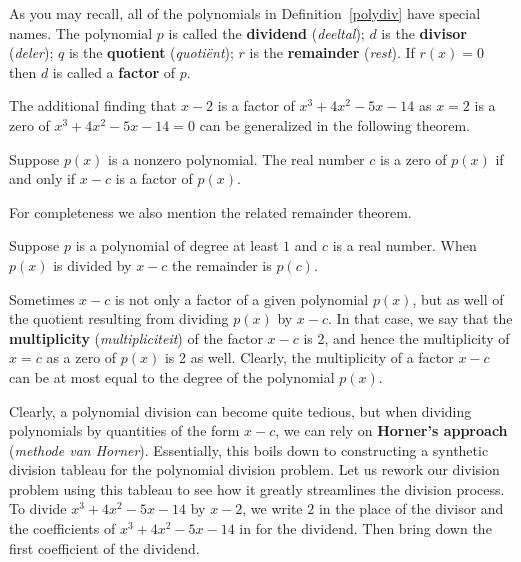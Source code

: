As you may recall, all of the polynomials in Definition~\ref{polydiv} have special names.  The polynomial $p$ is called the  \textbf{dividend} (\textit{deeltal}); $d$ is the  \textbf{divisor} (\textit{deler}); $q$ is the  \textbf{quotient} (\textit{quoti\"ent}); $r$ is the  \textbf{remainder} (\textit{rest}).  If $r(x)=0$ then $d$ is called a  \textbf{factor} of $p$.  


The additional finding that $x-2$ is a factor of $x^3 + 4x^2-5x-14$ as $x=2$ is a zero of $x^3 + 4x^2-5x-14=0$ can be generalized in the following theorem. 

\begin{theorem} \label{factorthm}
  Suppose  $p(x)$ is a nonzero polynomial.  The real number $c$ is a zero of  $p(x)$ if and only if $x-c$ is a factor of $p(x)$.  
\end{theorem}

For completeness we also mention the related remainder theorem.
\begin{theorem}
\label{remainderthm} Suppose $p$ is a polynomial of degree at least $1$ and $c$ is a real number.  When $p(x)$ is divided by $x-c$ the remainder is $p(c)$.  

\end{theorem}

Sometimes $x-c$ is not only a factor of a given polynomial $p(x)$, but as well of the quotient resulting from dividing $p(x)$ by $x-c$. In that case, we say that the \textbf{multiplicity} (\textit{multipliciteit}) of the factor $x-c$ is 2, and hence the multiplicity of $x=c$ as a zero of $p(x)$ is 2 as well. Clearly, the multiplicity of a factor $x-c$ can be at most equal to the degree of the polynomial $p(x)$. 

Clearly, a polynomial division can become quite tedious, but when dividing polynomials by quantities of the form $x-c$, we can rely on \textbf{Horner's approach} (\textit{methode van Horner}).  Essentially, this boils down to constructing a synthetic division tableau for the polynomial division problem.  Let us rework our division problem using this tableau to see how it greatly streamlines the division process.  To divide $x^3+4x^2-5x-14$ by $x-2$, we write $2$ in the place of the divisor and the coefficients of $x^3+4x^2-5x-14$ in for the dividend.  Then bring down the first coefficient of the dividend.

